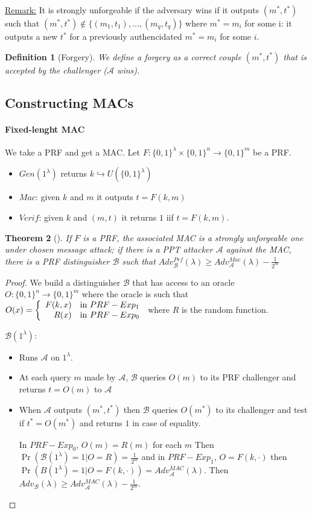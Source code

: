 \documentclass{article}
\newtheorem{thm}{Theorem}[section]
\newtheorem{defi}[thm]{Definition}
\newcommand{\Thm}[3]{\begin{thm}[#1]\label{#2}#3\end{thm}}
\newcommand{\Def}[3]{\begin{defi}[#1]\label{#2}#3\end{defi}}
\newcommand{\Rem}{\underline{Remark:} }
\newcommand{\A}{\mathcal{A}}
\newcommand{\B}{\mathcal{B}}
\newcommand{\bit}{\{0,1\}}
\begin{document}
\Rem It is strongly unforgeable if the adversary wins if it outputs $(m^*,t^*)$ such that $(m^*,t^*)\notin\{(m_1,t_1),...,(m_q,t_q)\}$ where $m^*=m_i$ for some i: it outputs a new $t^*$ for a previously authencidated $m^*=m_i$ for some $i$.

\Def{Forgery}{def:forgery}{We define a forgery as a correct couple $(m^*,t^*)$ that is accepted by the challenger ($\A$ wins).}

\subsection{Constructing MACs}
\paragraph{Fixed-lenght MAC} We take a PRF and get a MAC. Let $F:\bit^\lambda\times\bit^n\rightarrow\bit^m$ be a PRF.\begin{itemize}
\item $Gen(1^\lambda)$ returns $k\hookrightarrow U(\bit^\lambda)$
\item $Mac$: given $k$ and $m$ it outputs $t=F(k,m)$
\item $Verif$: given $k$ and $(m,t)$ it returns $1$ iif $t=F(k,m)$.
\end{itemize}

\Thm{}{thm:cstrongunforgeMacbyPRF}{If $F$ is a PRF, the associated MAC is a strongly unforgeable one under chosen message attack; if there is a PPT attacker $\A$ against the MAC, there is a PRF distinguisher $\B$ such that $Adv_\B^{Prf}(\lambda)\geq Adv_\A^{Mac}(\lambda)-\frac{1}{2^m}$}

\begin{proof}
We build a distinguisher $\B$ that has access to an oracle $O:\bit^n\rightarrow\bit^m$ where the oracle is such that $O(x)=\left\{\begin{array}{r l}
F(k,x) & \text{in $PRF-Exp_1$}\\
R(x) & \text{in $PRF-Exp_0$}
\end{array}\right.$ where $R$ is the random function.

$\B(1^\lambda)$:\begin{itemize}
\item Runs $\A$ on $1^\lambda$.
\item At each query $m$ made by $\A$, $\B$ queries $O(m)$ to its PRF challenger and returns $t=O(m)$ to $\A$
\item When $\A$ outputs $(m^*,t^*)$ then $\B$ queries $O(m^*)$ to its challenger and test if $t^*=O(m^*)$ and returns $1$ in case of equality.

In $PRF-Exp_0$, $O(m)=R(m)$ for each $m$ Then $\Pr(\B(1^\lambda)=1|O=R)=\frac{1}{2^m}$ and in $PRF-Exp_1$, $O=F(k,\cdot)$ then $\Pr(B(1^\lambda)=1|O=F(k,\cdot)) = Adv_\A^{MAC}(\lambda)$. Then $Adv_\B(\lambda)\geq Adv_\A^{MAC}(\lambda) - \frac{1}{2^m}$.
\end{itemize}
\end{proof}
\end{document}

